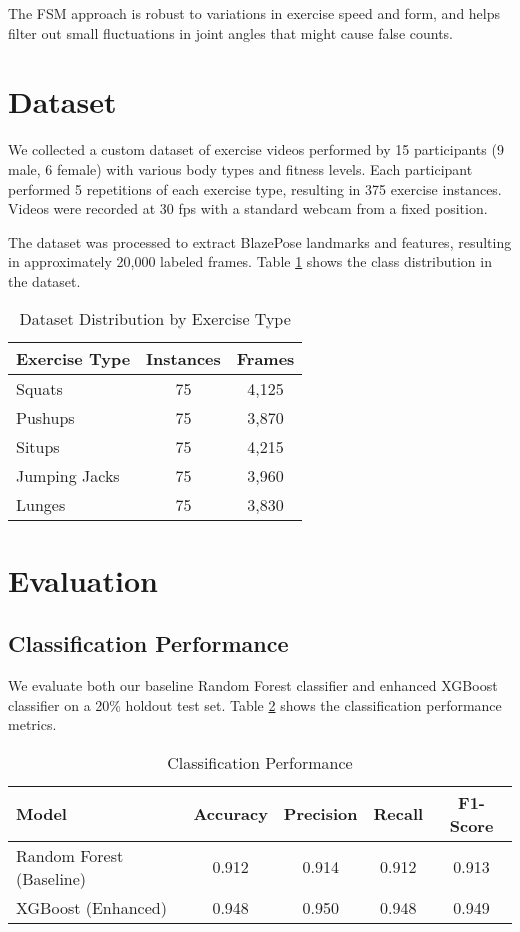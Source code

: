 \documentclass[conference]{IEEEtran}
\begin{document}
The FSM approach is robust to variations in exercise speed and form, and helps filter out small fluctuations in joint angles that might cause false counts.

\section{Dataset}
We collected a custom dataset of exercise videos performed by 15 participants (9 male, 6 female) with various body types and fitness levels. Each participant performed 5 repetitions of each exercise type, resulting in 375 exercise instances. Videos were recorded at 30 fps with a standard webcam from a fixed position.

The dataset was processed to extract BlazePose landmarks and features, resulting in approximately 20,000 labeled frames. Table \ref{tab:dataset} shows the class distribution in the dataset.

\begin{table}[htbp]
\centering
\caption{Dataset Distribution by Exercise Type}
\label{tab:dataset}
\begin{tabular}{@{}lcc@{}}
\toprule
\textbf{Exercise Type} & \textbf{Instances} & \textbf{Frames} \\
\midrule
Squats & 75 & 4,125 \\
Pushups & 75 & 3,870 \\
Situps & 75 & 4,215 \\
Jumping Jacks & 75 & 3,960 \\
Lunges & 75 & 3,830 \\
\bottomrule
\end{tabular}
\end{table}

\section{Evaluation}

\subsection{Classification Performance}
We evaluate both our baseline Random Forest classifier and enhanced XGBoost classifier on a 20\% holdout test set. Table \ref{tab:performance} shows the classification performance metrics.

\begin{table}[htbp]
\centering
\caption{Classification Performance}
\label{tab:performance}
\begin{tabular}{@{}lcccc@{}}
\toprule
\textbf{Model} & \textbf{Accuracy} & \textbf{Precision} & \textbf{Recall} & \textbf{F1-Score} \\
\midrule
Random Forest (Baseline) & 0.912 & 0.914 & 0.912 & 0.913 \\
XGBoost (Enhanced) & 0.948 & 0.950 & 0.948 & 0.949 \\
\bottomrule
\end{tabular}
\end{table}
\end{document}
